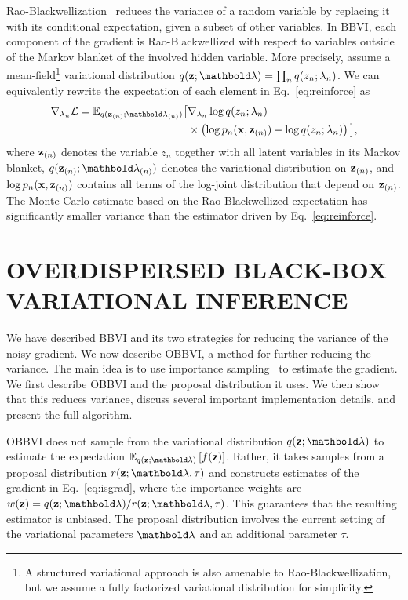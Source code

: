 \documentclass[]{article}
\begin{document}
Rao-Blackwellization~\citep{Casella1996} reduces the variance of a
random variable by replacing it with its conditional expectation,
given a subset of other variables. In \gls{BBVI}, each component of
the gradient is Rao-Blackwellized with respect to variables outside of
the Markov blanket of the involved hidden variable. More precisely,
assume a mean-field\footnote{A structured
  variational approach is also amenable to Rao-Blackwellization, but
  we assume a fully factorized variational distribution for
  simplicity.} variational distribution
$q(\bz;\blambda)=\prod_n q(z_n;\lambda_n)$.
We can equivalently rewrite the expectation of each
element in Eq.~\ref{eq:reinforce} as
\begin{align}
  \label{eq:rao-blackwell}
  \begin{split}
    \nabla_{\lambda_n} \Lcal = \mathbb{E}_{q(\bz_{(n)};\blambda_{(n)})} \big[& \nabla_{\lambda_n} \log q(z_n;\lambda_n) \\
    & \times\left(\log p_n(\bx,\bz_{(n)})-\log q(z_n;\lambda_n)\right) \big],
  \end{split}
\end{align}
where $\mathbf{z}_{(n)}$ denotes the variable $z_n$ together with all latent
variables in its Markov blanket, $q(\bz_{(n)};\blambda_{(n)})$ denotes the
variational distribution on $\mathbf{z}_{(n)}$, and $\log p_n(\mathbf{x},\mathbf{z}_{(n)})$
contains all terms of the log-joint distribution that depend on
$\mathbf{z}_{(n)}$.  The Monte Carlo estimate based on the Rao-Blackwellized
expectation has significantly smaller variance than the estimator
driven by Eq.~\ref{eq:reinforce}.


\section{OVERDISPERSED BLACK-BOX VARIATIONAL INFERENCE}
\label{sec:isbbvi}

We have described \gls{BBVI} and its two strategies for reducing the
variance of the noisy gradient.  We now describe \gls{OBBVI}, a method
for further reducing the variance.  The main idea is to use importance
sampling~\citep{Robert2005,Rubinstein2011} to estimate the gradient.
We first describe \gls{OBBVI} and the proposal distribution it uses.
We then show that this reduces variance, discuss several important
implementation details, and present the full algorithm.

\gls{OBBVI} does not sample from the variational distribution
$q(\bz;\blambda)$ to estimate the expectation
$\E{q(\bz;\blambda)}{f(\bz)}$.  Rather, it takes samples from a
proposal distribution $r(\bz; \blambda, \tau)$ and constructs
estimates of the gradient in Eq.~\ref{eq:isgrad}, where the
importance weights are
$w(\bz) = q(\bz;\blambda)/r(\bz; \blambda, \tau)$. This guarantees
that the resulting estimator is unbiased. The proposal
distribution involves the current setting of the variational
parameters $\blambda$ and an additional parameter $\tau$. 
\end{document}
